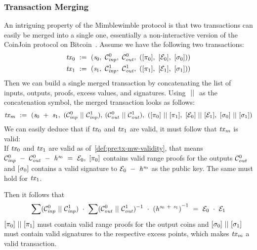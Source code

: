 \subsubsection{Transaction Merging \label{sec:pre:mimblewimble:merge}}
An intriguing property of the Mimblewimble protocol is that two transactions can easily be merged into a single one, essentially a non-interactive version of the CoinJoin protocol on Bitcoin~\cite{maxwell2013coinjoin}.
Assume we have the following two transactions:
\begin{gather*}
    \mathit{tx}_0 ~:=~ (\mathit{s}_0 ,~ \mathcal{C}_{\mathit{inp}}^0 ,~ \mathcal{C}_{\mathit{out}}^0 ,~ ([\pi_0] ,~ [\mathcal{E}_0] ,~ [\sigma_0]) )\\
    \mathit{tx}_1 ~:=~ (\mathit{s}_1 ,~ \mathcal{C}_{\mathit{inp}}^1 ,~ \mathcal{C}_{\mathit{out}}^1 ,~ ([\pi_1] ,~ [\mathcal{E}_1] ,~ [\sigma_1]) )\\
\end{gather*}
Then we can build a single merged transaction by concatenating the list of inputs, outputs, proofs, excess values, and signatures.
Using $~||~$ as the concatenation symbol, the merged transaction looks as follows:
\[ \mathit{tx}_m ~:=~ (\mathit{s}_0 ~+~ \mathit{s}_1 ,~ (\mathcal{C}_{\mathit{inp}}^0 ~||~ \mathcal{C}_{\mathit{inp}}^1), \: (\mathcal{C}_{\mathit{out}}^0 ~||~ \mathcal{C}_{\mathit{out}}^1) ,~ ([\pi_0] ~||~ [\pi_1] ,~
[\mathcal{E}_0] ~||~ [\mathcal{E}_1] ,~ [\sigma_0] ~||~ [\sigma_1]) \]
We can easily deduce that if $\mathit{tx}_0$ and $\mathit{tx}_1$ are valid, it must follow that $\mathit{tx}_m$ is valid:\\
If $\mathit{tx}_0$ and $\mathit{tx}_1$ are valid as of~\cref{def:pre:tx-mw-validity}, that means $\mathcal{C}_{\mathit{inp}}^0 ~-~ \mathcal{C}_{\mathit{out}}^0 ~-~ \mathit{h}^{\mathit{s}_0} ~=~ \mathcal{E}_0 ,~ [\pi_0]$ contains valid range proofs for the outputs $\mathcal{C}_{\mathit{out}}^0$ and $[\sigma_0]$ contains a valid signature to $\mathcal{E}_0 ~-~ \mathit{h}^{\mathit{s}_0}$ as the public key.
The same must hold for $\mathit{tx}_1$.

Then it follows that
\[ \sum (\mathcal{C}_{\mathit{inp}}^0 ~||~ \mathcal{C}_{\mathit{inp}}^1) ~\cdot~ \sum (\mathcal{C}_{\mathit{out}}^0 ~||~ \mathcal{C}_{\mathit{out}}^1)^{-1} ~\cdot~ {(\mathit{h}^{\mathit{s}_0 ~+~ \mathit{s}_1})}^{-1} ~=~ \mathcal{E}_0 ~\cdot~ \mathcal{E}_1  \]
$[\pi_0] ~||~ [\pi_1]$ must contain valid range proofs for the output coins and $[\sigma_0] ~||~ [\sigma_1]$ must contain valid signatures to the respective excess points, which makes $\mathit{tx}_m$ a valid transaction.

